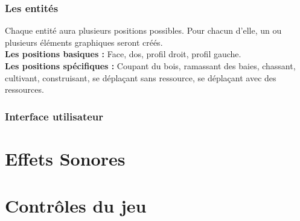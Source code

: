 \documentclass[a4paper]{article}
\begin{document}
    \section{Les entités}
      Chaque entité aura plusieurs positions possibles. Pour chacun d'elle, un ou plusieurs éléments graphiques seront créés.\\
      \textbf{Les positions basiques :} Face, dos, profil droit, profil gauche.\\
      \textbf{Les positions spécifiques :} Coupant du bois, ramassant des baies, chassant, cultivant, construisant, se déplaçant sans ressource, se déplaçant avec des ressources.
	
	\section{Interface utilisateur}
		

  \newpage
  \part{Effets Sonores}
  


  \newpage
  \part{Contrôles du jeu}
  
  
\end{document}
